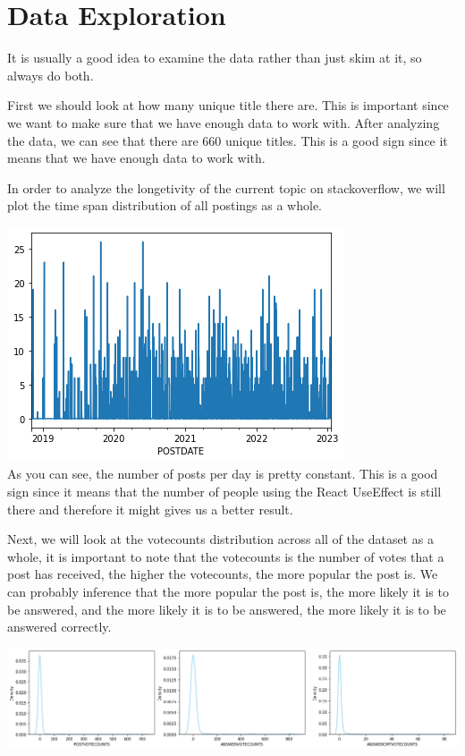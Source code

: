 \section{Data Exploration}
It is usually a good idea to examine the data rather than just skim at it, so always do both.

First we should look at how many unique title there are. This is important since we want to make sure that we have enough data to work with. After analyzing the data, we can see that there are 660 unique titles. This is a good sign since it means that we have enough data to work with.

In order to analyze the longetivity of the current topic on stackoverflow, we will plot the time span distribution of all postings as a whole.

\noindent  \includegraphics[scale=1]{post-time-distri.png}\\

As you can see, the number of posts per day is pretty constant. This is a good sign since it means that the number of people using the React UseEffect is still there and therefore it might gives us a better result.

Next, we will look at the votecounts distribution across all of the dataset as a whole, it is important to note that the votecounts is the number of votes that a post has received, the higher the votecounts, the more popular the post is. We can probably inference that the more popular the post is, the more likely it is to be answered, and the more likely it is to be answered, the more likely it is to be answered correctly.

\noindent \includegraphics[scale=0.35]{votecounts-distri.png}\\

